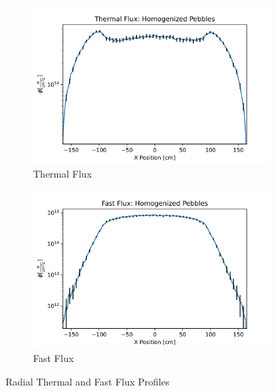 \begin{figure}[h!]
\centering

\begin{subfigure}{0.6\textwidth}
  \includegraphics[width=0.95\linewidth]{figures/therm_flux_homog.png}
  \caption{Thermal Flux}
  \label{fig:hom-det-xy-therm}
\end{subfigure}%
%
\begin{subfigure}{0.6\textwidth}
  \includegraphics[width=0.95\linewidth]{figures/fast_flux_homog.png}
  \caption{Fast Flux}
  \label{fig:hom-det-xy-fast}
\end{subfigure}

%
\caption{Radial Thermal and Fast Flux Profiles}
\label{fig:hom-det-xy}
\end{figure}